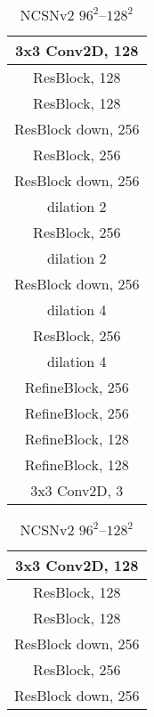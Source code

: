 \documentclass{article}
\begin{document}
\begin{table}[H]
    \centering
    \caption{The architectures of NCSNv2 for images of various resolutions.}\label{tab:ncsnv2}
    \begin{subtable}[t]{0.3\linewidth}
        \centering
        \caption{NCSNv2 $32^2$--$64^2$}\label{tab:ncsnv2_small_arch}
        \begin{tabular}{c}
        \toprule \toprule
        3x3 Conv2D, 128\\
        \midrule
        ResBlock, 128\\
        \midrule
        ResBlock, 128 \\
        \midrule
        ResBlock down, 256\\
        \midrule
        ResBlock, 256\\
        \midrule
        ResBlock down, 256\\ dilation 2\\
        \midrule
        ResBlock, 256\\ dilation 2\\
        \midrule
        ResBlock down, 256\\ dilation 4\\
        \midrule
        ResBlock, 256\\ dilation 4\\
        \midrule
        RefineBlock, 256\\
        \midrule
        RefineBlock, 256\\
        \midrule
        RefineBlock, 128\\
        \midrule
        RefineBlock, 128\\
        \midrule
        3x3 Conv2D, 3\\
        \bottomrule
        \end{tabular}
    \end{subtable}
    \hfill
    \begin{subtable}[t]{0.3\linewidth}
        \centering
        \caption{NCSNv2 $96^2$--$128^2$}
        \begin{tabular}{c}
        \toprule \toprule
        3x3 Conv2D, 128\\
        \midrule
        ResBlock, 128\\
        \midrule
        ResBlock, 128 \\
        \midrule
        ResBlock down, 256\\
        \midrule
        ResBlock, 256\\
        \midrule
        ResBlock down, 256\\

\end{tabular}
\end{subtable}
\end{table}
\end{document}
